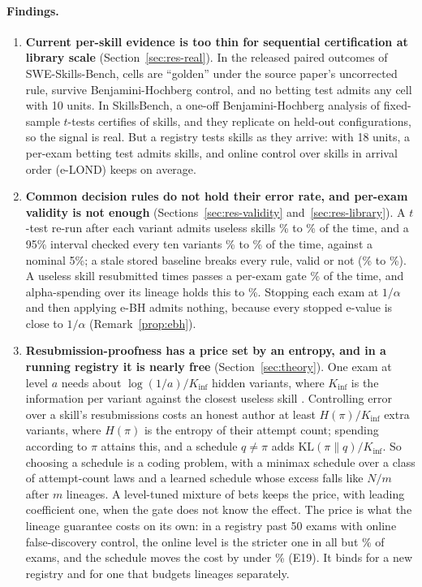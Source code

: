 \paragraph{Findings.}
\begin{enumerate}
\item \textbf{Current per-skill evidence is too thin for sequential certification at library scale} (Section~\ref{sec:res-real}). In the released paired outcomes of SWE-Skills-Bench, \NSweGolden{} cells are ``golden'' under the source paper's uncorrected rule, \NSweBH{} survive Benjamini-Hochberg control, and no betting test admits any cell with 10 units. In SkillsBench, a one-off Benjamini-Hochberg analysis of fixed-sample $t$-tests certifies \NSbTBH{} of \NSbTasks{} skills, and they replicate on held-out configurations, so the signal is real. But a registry tests skills as they arrive: with 18 units, a per-exam betting test admits \NSbBet{} skills, and online control over skills in arrival order (e-LOND) keeps \NSbELond{} on average.
\item \textbf{Common decision rules do not hold their error rate, and per-exam validity is not enough} (Sections~\ref{sec:res-validity} and~\ref{sec:res-library}). A $t$-test re-run after each variant admits useless skills \NEOnePeekTMin\% to \NEOnePeekTMax\% of the time, and a 95\% interval checked every ten variants \NEOnePeekCIMin\% to \NEOnePeekCIMax\% of the time, against a nominal 5\%; a stale stored baseline breaks every rule, valid or not (\NEOneStaleMin\% to \NEOneStaleMax\%). A useless skill resubmitted \PResub{} times passes a per-exam gate \NResubPerExam\% of the time, and alpha-spending over its lineage holds this to \NResubLineage\%. Stopping each exam at $1/\alpha$ and then applying e-BH admits nothing, because every stopped e-value is close to $1/\alpha$ (Remark~\ref{prop:ebh}).
\item \textbf{Resubmission-proofness has a price set by an entropy, and in a running registry it is nearly free} (Section~\ref{sec:theory}). One exam at level $a$ needs about $\log(1/a)/K_{\inf}$ hidden variants, where $K_{\inf}$ is the information per variant against the closest useless skill \citep{agrawal2025stopping}. Controlling error over a skill's resubmissions costs an honest author at least $H(\pi)/K_{\inf}$ extra variants, where $H(\pi)$ is the entropy of their attempt count; spending according to $\pi$ attains this, and a schedule $q\neq\pi$ adds $\mathrm{KL}(\pi\|q)/K_{\inf}$. So choosing a schedule is a coding problem, with a minimax schedule over a class of attempt-count laws and a learned schedule whose excess falls like $N/m$ after $m$ lineages. A level-tuned mixture of bets keeps the price, with leading coefficient one, when the gate does not know the effect. The price is what the lineage guarantee costs on its own: in a registry past 50 exams with online false-discovery control, the online level is the stricter one in all but \NLcBindMax\% of exams, and the schedule moves the cost by under \NLcSchedSpread\% (E19). It binds for a new registry and for one that budgets lineages separately.

\end{enumerate}
